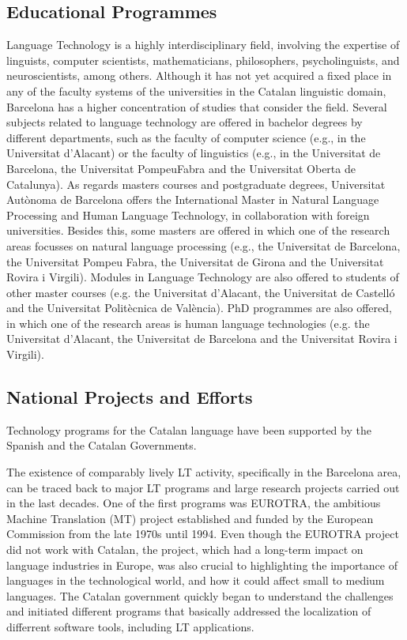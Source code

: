 \begin{multicols}{2}
\subsection{Educational Programmes}

Language Technology is a highly interdisciplinary field, involving the expertise of linguists, computer scientists, mathematicians, philosophers, psycholinguists, and neuroscientists, among others. Although it has not yet acquired a fixed place in any of the faculty systems of the universities in the Catalan linguistic domain, Barcelona has a higher concentration of studies that consider the field. 
Several subjects related to language technology are offered in bachelor degrees by different departments, such as the faculty of computer science (e.g., in the Universitat d’Alacant) or the faculty of linguistics (e.g., in the Universitat de Barcelona, the Universitat PompeuFabra and the Universitat Oberta de Catalunya).
As regards masters courses and postgraduate degrees, Universitat Autònoma de Barcelona offers the International Master in Natural Language Processing and Human Language Technology, in collaboration with foreign universities. Besides this, some masters are offered in which one of the research areas focusses on natural language processing (e.g., the Universitat de Barcelona, the Universitat Pompeu Fabra, the Universitat de Girona and the Universitat Rovira i Virgili). Modules in Language Technology are also offered to students of other master courses (e.g. the Universitat d’Alacant, the Universitat de Castelló and the Universitat Politècnica de València). 
PhD programmes are also offered, in which one of the research areas is human language technologies (e.g. the Universitat d’Alacant, the Universitat de Barcelona and the Universitat Rovira i Virgili).

\subsection{National Projects and Efforts}

Technology programs for the Catalan language have been supported by the Spanish and the Catalan Governments.

The existence of comparably lively LT activity, specifically in the Barcelona area, can be traced back to major LT programs and large research projects carried out in the last decades. One of the first programs was EUROTRA, the ambitious Machine Translation (MT) project established and funded by the European Commission from the late 1970s until 1994. Even though the EUROTRA project did not work with Catalan, the project, which had a long-term impact on language industries in Europe, was also crucial to highlighting the importance of languages in the technological world, and how it could affect small to medium languages. The Catalan government quickly began to understand the challenges and initiated different programs that basically addressed the localization of differrent software tools, including LT applications. 


\end{multicols}
